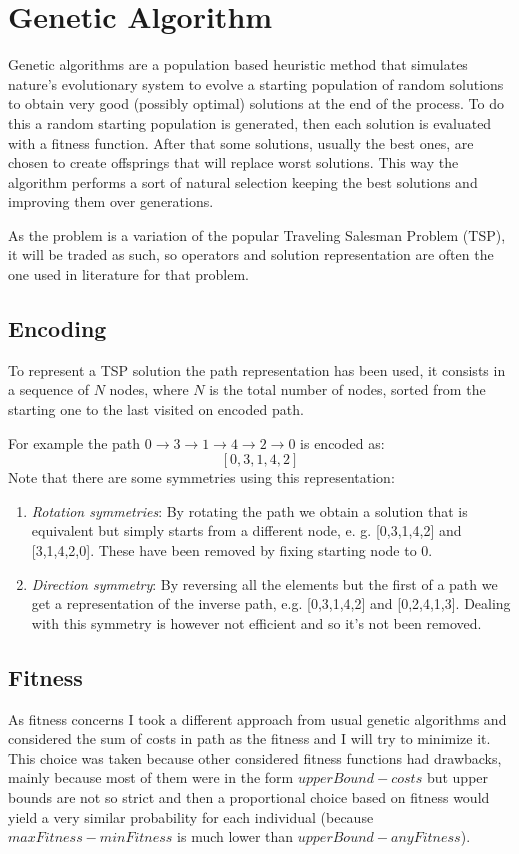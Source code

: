 \section{Genetic Algorithm}
	Genetic algorithms are a population based heuristic method that simulates nature's evolutionary system to evolve a starting population of random solutions to obtain very good (possibly optimal) solutions at the end of the process. To do this a random starting population is generated, then each solution is evaluated with a fitness function. After that some solutions, usually the best ones, are chosen to create offsprings that will replace worst solutions. This way the algorithm performs a sort of natural selection keeping the best solutions and improving them over generations.
	
	As the problem is a variation of the popular Traveling Salesman Problem (TSP), it will be traded as such, so operators and solution representation are often the one used in literature for that problem.
		
	\subsection{Encoding}
		To represent a TSP solution the path representation has been used, it consists in a sequence of $N$ nodes, where $N$ is the total number of nodes, sorted from the starting one to the last visited on encoded path.
		
		For example the path $0 \rightarrow 3 \rightarrow 1 \rightarrow 4 \rightarrow 2 \rightarrow 0$ is encoded as:
		\[[0, 3, 1, 4, 2]\]
		Note that there are some symmetries using this representation:
		\begin{enumerate}
			\item \textit{Rotation symmetries}: By rotating the path we obtain a solution that is equivalent but simply starts from a different node, e. g. [0,3,1,4,2] and [3,1,4,2,0]. These have been removed by fixing starting node to 0.
			\item \textit{Direction symmetry}: By reversing all the elements but the first of a path we get a representation of the inverse path, e.g. [0,3,1,4,2] and [0,2,4,1,3]. Dealing with this symmetry is however not efficient and so it's not been removed.
		\end{enumerate}
	
	\subsection{Fitness}
		As fitness concerns I took a different approach from usual genetic algorithms and considered the sum of costs in path as the fitness and I will try to minimize it.
		This choice was taken because other considered fitness functions had drawbacks, mainly because most of them were in the form $upperBound - costs$ but upper bounds are not so strict and then a proportional choice based on fitness would yield a very similar probability for each individual (because $maxFitness - minFitness$ is much lower than $upperBound - anyFitness$).
		
